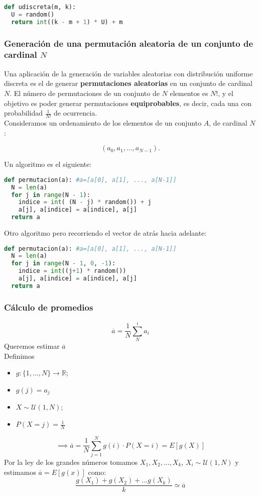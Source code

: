 \documentclass[11pt, a4paper]{article}
\theoremstyle{definition}
\begin{document}
\begin{lstlisting}[language=Python]
def udiscreta(m, k):
  U = random()
  return int((k - m + 1) * U) + m
\end{lstlisting}

\subsubsection*{Generación de una permutación aleatoria de un conjunto de cardinal $N$}
Una aplicación de la generación de variables aleatorias con distribución uniforme discreta es el de generar \textbf{permutaciones aleatorias} en un conjunto de cardinal \( N \). El número de permutaciones de un conjunto de \( N \) elementos es \( N! \), y el objetivo es poder generar permutaciones \textbf{equiprobables}, es decir, cada una con probabilidad \(\frac{1}{N!}\) de ocurrencia.
\\
Consideramos un ordenamiento de los elementos de un conjunto \( A \), de cardinal \( N \):

\[
(a_0, a_1, \ldots, a_{N-1}).
\]

Un algoritmo es el siguiente:
\begin{lstlisting}[language=Python]
def permutacion(a): #a=[a[0], a[1], ..., a[N-1]]
  N = len(a)
  for j in range(N - 1):
    indice = int( (N - j) * random()) + j
    a[j], a[indice] = a[indice], a[j]
  return a
\end{lstlisting}

Otro algoritmo pero recorriendo el vector de atrás hacia adelante:
\begin{lstlisting}[language=Python]
def permutacion(a): #a=[a[0], a[1], ..., a[N-1]]
  N = len(a)
  for j in range(N - 1, 0, -1):
    indice = int((j+1) * random())
    a[j], a[indice] = a[indice], a[j]
  return a
\end{lstlisting}

\newpage

\subsubsection{Cálculo de promedios}
\[
\overline{a} = \frac{1}{N} \sum_{N}^{i}a_i
\]
Queremos estimar $\overline{a}$
\\
Definimos 
\begin{itemize}
  \item $g: \{1, \ldots, N\} \to \mathbb{R}$;
  \item $ g(j) = a_j$
  \item $X \sim \mathcal{U}(1, N)$; 
  \item $P(X = j) = \frac{1}{N}$
\end{itemize}
\[
\implies \overline{a} = \frac{1}{N} \sum_{j=1}^{N} g(i) \cdot P(X = i) = E[g(X)]
\]
Por la ley de los grandes números tomamos $X_1, X_2, \ldots, X_k$, $X_i \sim \mathcal{U}(1, N)$ y estimamos $\overline{a} = E[g(x)]$ como:
\[
  \frac{g(X_1) + g(X_2) + \ldots g(X_k)}{k} \simeq \overline{a}
\]
\end{document}

